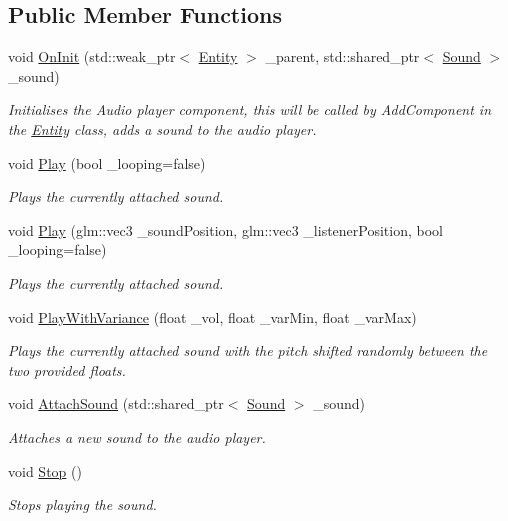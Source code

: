 \subsection*{Public Member Functions}
\begin{DoxyCompactItemize}
\item 
void \hyperlink{classfrontier_1_1_audio_player_a6a000a15e398c4de2eb767c4a4cbede7}{On\+Init} (std\+::weak\+\_\+ptr$<$ \hyperlink{classfrontier_1_1_entity}{Entity} $>$ \+\_\+parent, std\+::shared\+\_\+ptr$<$ \hyperlink{classfrontier_1_1_sound}{Sound} $>$ \+\_\+sound)
\begin{DoxyCompactList}\small\item\em Initialises the Audio player component, this will be called by Add\+Component in the \hyperlink{classfrontier_1_1_entity}{Entity} class, adds a sound to the audio player. \end{DoxyCompactList}\item 
void \hyperlink{classfrontier_1_1_audio_player_ad5791ca0776113116a815f86bd630ad7}{Play} (bool \+\_\+looping=false)
\begin{DoxyCompactList}\small\item\em Plays the currently attached sound. \end{DoxyCompactList}\item 
void \hyperlink{classfrontier_1_1_audio_player_a757be1bd81df8c3885b03177946b38d1}{Play} (glm\+::vec3 \+\_\+sound\+Position, glm\+::vec3 \+\_\+listener\+Position, bool \+\_\+looping=false)
\begin{DoxyCompactList}\small\item\em Plays the currently attached sound. \end{DoxyCompactList}\item 
void \hyperlink{classfrontier_1_1_audio_player_ad26964a251fa785cacd76617efa92ee3}{Play\+With\+Variance} (float \+\_\+vol, float \+\_\+var\+Min, float \+\_\+var\+Max)
\begin{DoxyCompactList}\small\item\em Plays the currently attached sound with the pitch shifted randomly between the two provided floats. \end{DoxyCompactList}\item 
void \hyperlink{classfrontier_1_1_audio_player_abb7536bee69926c8643a9c3ab6eb714f}{Attach\+Sound} (std\+::shared\+\_\+ptr$<$ \hyperlink{classfrontier_1_1_sound}{Sound} $>$ \+\_\+sound)
\begin{DoxyCompactList}\small\item\em Attaches a new sound to the audio player. \end{DoxyCompactList}\item 
void \hyperlink{classfrontier_1_1_audio_player_a0e22a78d69571eac70811c8457eeda50}{Stop} ()
\begin{DoxyCompactList}\small\item\em Stops playing the sound. \end{DoxyCompactList}\end{DoxyCompactItemize}

